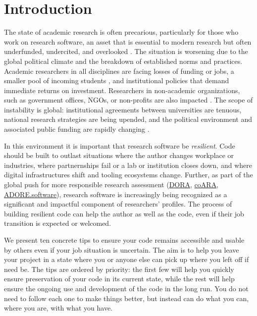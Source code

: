 \documentclass[10pt,letterpaper]{article}
\begin{document}
\linenumbers

\section*{Introduction}

The state of academic research is often precarious,
particularly for those who work on research software,
an asset that is essential to modern research \cite{Pearson2025}
but often underfunded, undercited, and overlooked \cite{Carver2022}.
The situation is worsening due to the global political climate
and the breakdown of established norms and practices.
Academic researchers in all disciplines are facing losses of funding or jobs,
a smaller pool of incoming students \cite{Mallapaty2025},
and institutional policies that demand immediate returns on investment.
Researchers in non-academic organizations,
such as government offices, NGOs, or non-profits are also impacted \cite{Woodward2025}.
The scope of instability is global:
institutional agreements between universities are tenuous,
national research strategies are being upended,
and the political environment and associated public funding are rapidly changing \cite{Nature2025}.

In this environment it is important that research software be \emph{resilient}.
Code should be built to outlast situations where the author changes workplace or industries,
where partnernships fail or a lab or institution closes down,
and where digital infrastructures shift and tooling ecosystems change.
Further,
as part of the global push for more responsible research assessment
(\href{https://sfdora.org/}{DORA}, \href{https://coara.eu/}{coARA}, \href{https://adore.software/}{ADORE.software}),
research software is increasingly being recognized as a significant and impactful component of researchers' profiles.
The process of building resilient code can help the author as well as the code,
even if their job transition is expected or welcomed.

We present ten concrete tips to ensure your code remains accessible and usable by others
even if your job situation is uncertain.
The aim is to help you leave your project in a state
where you or anyone else can pick up where you left off if need be.
The tips are ordered by priority:
the first few will help you quickly ensure preservation of your code in its current state,
while the rest will help ensure the ongoing use and development of the code in the long run.
You do not need to follow each one to make things better,
but instead can do what you can,
where you are,
with what you have.
\end{document}
